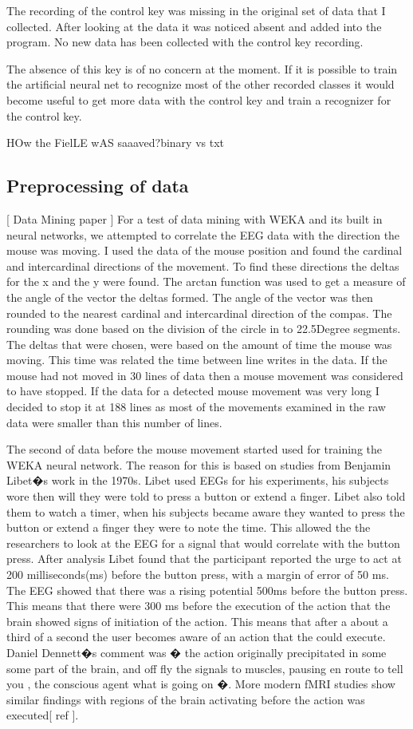 The recording of the control key was missing in the original set of data that I collected. After looking at the data it was noticed absent and added into the program. No new data has been collected with the control key recording. 

The absence of this key is of no concern at the moment. If it is possible to train the artificial neural net to recognize most of the other recorded classes it would become useful to get more data with the control key and train a recognizer for the control key.

HOw the FielLE wAS saaaved?binary vs txt

\subsection{Preprocessing of data} [ Data Mining paper ]
For a test of data mining with WEKA and its built in neural networks, we attempted to correlate the EEG data with the direction the mouse was moving. I used the data of the mouse position and found the cardinal and intercardinal directions of the movement. To find these directions the deltas for the x and the y were found. The arctan function was used to get a measure of the angle of the vector the deltas formed. The angle of the vector was then rounded to the nearest cardinal and intercardinal direction of the compas. The rounding was done based on the division of the circle in to 22.5Degree segments.  
    The deltas that were chosen, were based on the amount of time the mouse was moving. This time was related the time between line writes in the data. If the mouse had not moved in 30 lines of data then a mouse movement was considered to have stopped. If the data for a detected mouse movement was very long I decided to stop it at 188 lines as most of the movements examined in the raw data were smaller than this number of lines.

The second of data before the mouse movement started  used for training the WEKA neural network. The reason for this is based on studies from Benjamin Libet�s work in the 1970s.
Libet used EEGs for his experiments, his subjects wore then will they were told to press a button or extend a finger. Libet also told them to watch a timer, when his subjects became aware they wanted to press the button or extend a finger they were to note the time. This allowed the the researchers to look at the EEG for a signal that would correlate with the button press. After analysis Libet found that the participant reported the urge to act at 200 milliseconds(ms) before the button press, with a margin of error of 50 ms. The EEG showed that there was a rising potential 500ms before the button press. This means that there were 300 ms before the execution of the action that the brain showed signs of initiation of the action. This means that after a about a third of a second the user becomes aware of an action that the could execute. 
Daniel Dennett�s comment was � the action originally  precipitated  in some some part of the brain, and off fly the signals to muscles, pausing en route to tell you , the conscious agent what is going on �. More modern fMRI studies show similar findings with regions of the brain activating before the action was executed[ ref ]. 

